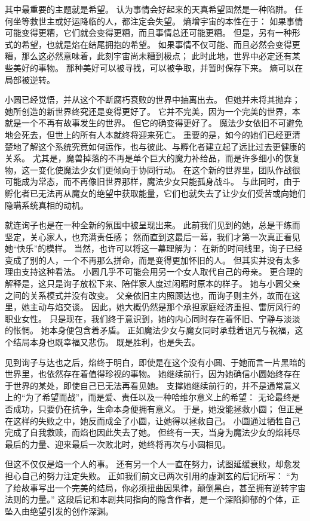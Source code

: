 其中最重要的主题就是希望。
认为事情会好起来的天真希望固然是一种陷阱。
任何坐等救世主或好运降临的人，都注定会失望。
熵增宇宙的本性在于：
如果事情可能变得更糟，它们就会变得更糟，而且事情总还可能更糟。
但是，另有一种形式的希望，也就是焰在结尾拥抱的希望。
如果事情不仅可能、而且必然会变得更糟，那么这必然意味着，此刻宇宙尚未糟到极点；
此时此地，世界中必定还有某些美好的事物。
那种美好可以被寻找，可以被争取，并暂时保存下来。
熵可以在局部被逆转。

小圆已经觉悟，并从这个不断腐朽衰败的世界中抽离出去。
但她并未将其抛弃；
她所创造的新世界终究还是变得更好了。
它并不完美，因为一个完美的世界，本就是一个不再有故事发生的世界。
但它的确变得更好了。
魔法少女依旧不可避免地会死去，但世上的所有人本就终将迎来死亡。
重要的是，如今的她们已经更清楚地了解这个系统究竟如何运作，也与彼此、与孵化者建立起了远比过去更健康的关系。
尤其是，魔兽掉落的不再是单个巨大的魔力补给品，而是许多细小的恢复物，这一变化使魔法少女们更倾向于协同行动。
在这个新的世界里，团队作战很可能成为常态，而不再像旧世界那样，魔法少女只能孤身战斗。
与此同时，由于孵化者已无法再从魔女的绝望中获取能量，它们也就失去了让少女们受苦或向她们隐瞒系统真相的动机。

就连询子也是在一种全新的氛围中被呈现出来。
此前我们见到的她，总是干练而坚定，关心家人，也充满责任感；
然而直到这最后一幕，我们才第一次真正看见她“快乐”的模样。
当然，也许可以将这一幕理解为：
在新的时间线里，询子已经变成了别的人，一个不再那么拼命，而是变得更加怀旧的人。
但其实并没有太多理由支持这种看法。
小圆几乎不可能会用另一个女人取代自己的母亲。
更合理的解释是，这只是询子放松下来、陪伴家人度过闲暇时原本的样子。
她与小圆父亲之间的关系模式并没有改变。
父亲依旧主内照顾达也，而询子则主外，故而在这里，她主动与焰交谈。
因此，她大概仍然是那个承担家庭经济重担、雷厉风行的职业女性。
只是现在，我们终于意识到，她的内心同时存在着怀旧、宁静与淡淡的怅惘。
她本身便包含着矛盾。
正如魔法少女与魔女同时承载着诅咒与祝福，这个结局本身也既幸福又悲伤。
既是胜利，也是失去。

见到询子与达也之后，焰终于明白，即使是在这个没有小圆、于她而言一片黑暗的世界里，也依然存在着值得珍视的事物。
她继续前行，因为她确信小圆始终存在于世界的某处，即使自己已无法再看见她。
支撑她继续前行的，并不是通常意义上的“为了希望而战”，而是爱、责任以及一种哈维尔意义上的希望：
无论最终是否成功，只要仍在抗争，生命本身便拥有意义。
于是，她没能拯救小圆；
但正是在这样的失败之中，她反而成全了小圆，让她得以拯救自己。
小圆通过牺牲自己完成了自我救赎，而焰也因此失去了她。
但终有一天，当身为魔法少女的焰耗尽最后的力量、迎来最后一次败北时，她终将再次与小圆相见。

但这不仅仅是焰一个人的事。
还有另一个人一直在努力，试图延缓衰败，却愈发担心自己的努力注定失败。
正如我们前文已两次引用的虚渊玄的后记所写：
“为了给故事写出一个完美的结局，你必须扭曲因果律，颠倒黑白，甚至拥有逆转宇宙法则的力量。”
\cite{ref29}这段后记和本剧共同指向的隐含作者，是一个深陷抑郁的个体，正坠入由绝望引发的创作深渊。

